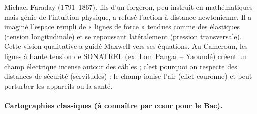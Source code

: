 \documentclass[11pt]{article}
\begin{document}
\begin{savaistu}
Michael Faraday (1791--1867), fils d'un forgeron, peu instruit en mathématiques mais génie de l'intuition physique, a refusé l'action à distance newtonienne. Il a imaginé l'espace rempli de « lignes de force » tendues comme des élastiques (tension longitudinale) et se repoussant latéralement (pression transversale). Cette vision qualitative a guidé Maxwell vers ses équations. Au Cameroun, les lignes à haute tension de SONATREL (ex: Lom Pangar -- Yaoundé) créent un champ électrique intense autour des câbles ; c'est pourquoi on respecte des distances de sécurité (servitudes) : le champ ionise l'air (effet couronne) et peut perturber les appareils ou la santé.
\end{savaistu}

\paragraph{Cartographies classiques (à connaître par cœur pour le Bac).}
\end{document}
